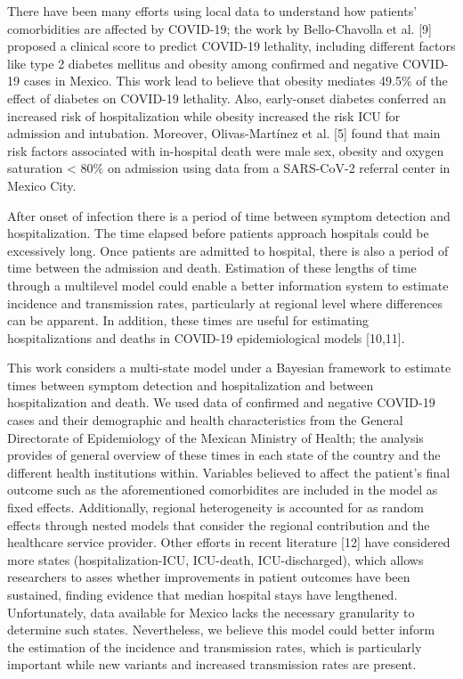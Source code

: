 \documentclass[10pt,letterpaper]{article}
\begin{document}
There have been many efforts using local data to understand how
patients' comorbidities are affected by COVID-19; the work by
Bello-Chavolla et al. {[}9{]} proposed a clinical score to predict
COVID-19 lethality, including different factors like type 2 diabetes
mellitus and obesity among confirmed and negative COVID-19 cases in
Mexico. This work lead to believe that obesity mediates 49.5\% of the
effect of diabetes on COVID-19 lethality. Also, early-onset diabetes
conferred an increased risk of hospitalization while obesity increased
the risk ICU for admission and intubation. Moreover,
Olivas-Mart\'{i}nez et al. {[}5{]} found that main risk factors
associated with in-hospital death were male sex, obesity and oxygen
saturation \textless{} 80\% on admission using data from a SARS-CoV-2
referral center in Mexico City.

After onset of infection there is a period of time between symptom
detection and hospitalization. The time elapsed before patients approach
hospitals could be excessively long. Once patients are admitted to
hospital, there is also a period of time between the admission and
death. Estimation of these lengths of time through a multilevel model
could enable a better information system to estimate incidence and
transmission rates, particularly at regional level where differences can
be apparent. In addition, these times are useful for estimating
hospitalizations and deaths in COVID-19 epidemiological models
{[}10,11{]}.

This work considers a multi-state model under a Bayesian framework to
estimate times between symptom detection and hospitalization and between
hospitalization and death. We used data of confirmed and negative
COVID-19 cases and their demographic and health characteristics from the
General Directorate of Epidemiology of the Mexican Ministry of Health;
the analysis provides of general overview of these times in each state
of the country and the different health institutions within. Variables
believed to affect the patient's final outcome such as the
aforementioned comorbidites are included in the model as fixed effects.
Additionally, regional heterogeneity is accounted for as random effects
through nested models that consider the regional contribution and the
healthcare service provider. Other efforts in recent literature {[}12{]}
have considered more states (hospitalization-ICU, ICU-death,
ICU-discharged), which allows researchers to asses whether improvements
in patient outcomes have been sustained, finding evidence that median
hospital stays have lengthened. Unfortunately, data available for Mexico
lacks the necessary granularity to determine such states. Nevertheless,
we believe this model could better inform the estimation of the
incidence and transmission rates, which is particularly important while
new variants and increased transmission rates are present.
\end{document}
